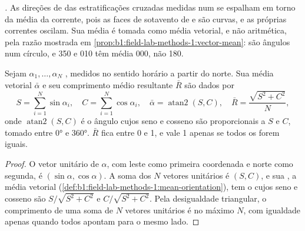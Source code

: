 \emph{.} As direções de  das estratificações cruzadas medidas num  se espalham em torno da  média da corrente, pois as faces de sotavento de  e  são curvas, e as próprias correntes oscilam. Sua média é tomada como média vetorial, e não aritmética, pela razão mostrada em \cref{prop:b1:field-lab-methods-1:vector-mean}:  são ângulos num círculo, e 350 e 010 têm média 000, não 180.

\begin{proposition}\label{prop:b1:clastic-sediments:azimuths}
Sejam $\alpha_1, \ldots, \alpha_N$ , medidos no sentido horário a partir do norte. Sua média vetorial $\bar\alpha$ e seu comprimento médio resultante $\bar R$ são dados por
\[
  S = \sum_{i=1}^N \sin\alpha_i, \quad C = \sum_{i=1}^N \cos\alpha_i, \quad
  \bar\alpha = \operatorname{atan2}(S, C), \quad \bar R = \frac{\sqrt{S^2 + C^2}}{N},
\]
onde $\operatorname{atan2}(S, C)$ é o ângulo cujos seno e cosseno são proporcionais a $S$ e $C$, tomado entre \ang{0} e \ang{360}. $\bar R$ fica entre 0 e 1, e vale 1 apenas se todos os  forem iguais.
\end{proposition}

\begin{proof}
O vetor unitário de  $\alpha$, com leste como primeira coordenada e norte como segunda, é $(\sin\alpha, \cos\alpha)$. A soma dos $N$ vetores unitários é $(S, C)$, e sua , a média vetorial (\cref{def:b1:field-lab-methods-1:mean-orientation}), tem o  cujos seno e cosseno são $S/\sqrt{S^2+C^2}$ e $C/\sqrt{S^2+C^2}$. Pela desigualdade triangular, o comprimento de uma soma de $N$ vetores unitários é no máximo $N$, com igualdade apenas quando todos apontam para o mesmo lado.
\end{proof}

